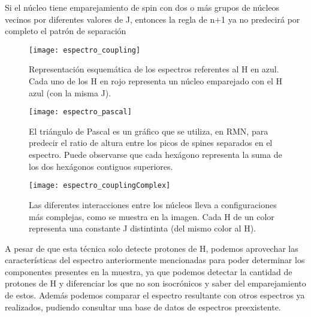Si el núcleo tiene emparejamiento de spin con dos o más grupos de núcleos vecinos por diferentes valores de J, entonces la regla de n+1 ya no predecirá por completo el patrón de separación


\begin{figure}[htb]
 \begin{figg}
   \texttt{[image: espectro\_coupling]}
   \caption{Representación esquemática de los espectros referentes al H en azul. Cada uno de los H en rojo representa un núcleo emparejado con el H azul (con la misma J).}
 \label{fig:espectro_coupling}
 \end{figg}
\end{figure}







\begin{figure}[htb]
 \begin{figg}
   \texttt{[image: espectro\_pascal]}
   \caption{El triángulo de Pascal es un gráfico que se utiliza, en RMN, para predecir el ratio de altura entre los picos de spines separados en el espectro. Puede observarse que cada hexágono representa la suma de los dos hexágonos contiguos superiores.}
 \label{fig:espectro_pascal}
 \end{figg}
\end{figure}

 




\begin{figure}[htb]
 \begin{figg}
   \texttt{[image: espectro\_couplingComplex]}
   \caption{Las diferentes interacciones entre los núcleos lleva a configuraciones más complejas, como se muestra en la imagen. Cada H de un color representa una constante J distintinta (del mismo color al H).}
 \label{fig:espectro_couplingComplex}
 \end{figg}
\end{figure}





A pesar de que esta técnica solo detecte protones de H, podemos aprovechar las características del espectro anteriormente mencionadas para poder determinar los componentes presentes en la muestra, ya que podemos detectar la cantidad de protones de H y diferenciar los que no son isocrónicos y saber del emparejamiento de estos. Además podemos comparar el espectro resultante con otros espectros ya realizados, pudiendo consultar una base de datos de espectros preexistente.


